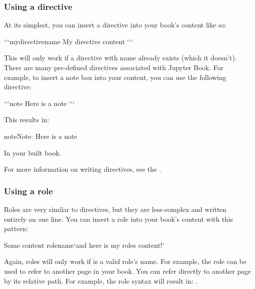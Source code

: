 \documentclass[letterpaper,10pt,english]{sphinxmanual}
\begin{document}
\subsubsection{Using a directive}
\label{\detokenize{markdown:using-a-directive}}
At its simplest, you can insert a directive into your book’s content like so:

\begin{sphinxVerbatim}[commandchars=\\\{\}]
{}`{}`{}`\PYGZob{}mydirectivename\PYGZcb{}
My directive content
{}`{}`{}`
\end{sphinxVerbatim}

This will only work if a directive with name  already exists
(which it doesn’t). There are many pre-defined directives associated with
Jupyter Book. For example, to insert a note box into your content, you can
use the following directive:

\begin{sphinxVerbatim}[commandchars=\\\{\}]
{}`{}`{}`\PYGZob{}note\PYGZcb{}
Here is a note
{}`{}`{}`
\end{sphinxVerbatim}

This results in:

\begin{sphinxadmonition}{note}{Note:}
Here is a note
\end{sphinxadmonition}

In your built book.

For more information on writing directives, see the
.


\subsubsection{Using a role}
\label{\detokenize{markdown:using-a-role}}
Roles are very similar to directives, but they are less-complex and written
entirely on one line. You can insert a role into your book’s content with
this pattern:

\begin{sphinxVerbatim}[commandchars=\\\{\}]
Some content \PYGZob{}rolename\PYGZcb{}{}`and here is my role\PYGZsq{}s content!{}`
\end{sphinxVerbatim}

Again, roles will only work if  is a valid role’s name. For example,
the  role can be used to refer to another page in your book. You can
refer directly to another page by its relative path. For example, the
role syntax  will result in: {\hyperref[\detokenize{intro::doc}]{}}.
\end{document}
